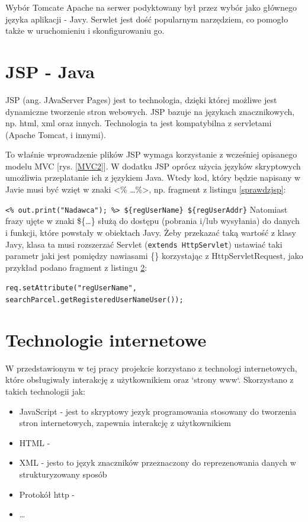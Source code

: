 \documentclass[eng,printmode,oneside]{mgr}
\begin{document}
Wybór Tomcate Apache na serwer podyktowany był przez wybór jako głównego języka
aplikacji - Javy. Serwlet jest dość popularnym narzędziem, co pomogło także w
uruchomieniu i skonfigurowaniu go.
\section{JSP - Java}

JSP (ang. JAvaServer Pages) jest to technologia, dzięki której możliwe jest
dynamiczne tworzenie stron webowych. JSP bazuje na językach znacznikowych, np.
html, xml oraz innych. Technologia ta jest kompatybilna z servletami (Apache
Tomcat, i innymi).

To właśnie wprowadzenie plików JSP wymaga korzystanie z wcześniej
opisanego modelu MVC [rys. \ref{MVC2}]. W dodatku JSP oprócz użycia języków
skryptowych umożliwia przeplatanie ich z językiem Java. Wtedy kod, który będzie
napisany w Javie musi być wzięt w znaki <\% \ldots \%>, np. fragment z listingu
\ref{sprawdzjsp}:

\texttt{<\% out.print("Nadawca"); \%> \$\{regUserName\}
\$\{regUserAddr\}}
Natomiast frazy ujęte w znaki \$\{\ldots\} służą do dostępu (pobrania
i/lub wysyłania) do danych i funkcji, które powstały w obiektach Javy. Żeby
przekazać taką wartość z klasy Javy, klasa ta musi rozszerzać Servlet
(\texttt{extends HttpServlet}) ustawiać taki parametr jaki jest pomiędzy
nawiasami \{\} korzystając z HttpServletRequest, jako przykład podano fragment z
listingu \ref{}:

\texttt{req.setAttribute("regUserName",
						searchParcel.getRegisteredUserNameUser());}

\section{Technologie internetowe}

W przedstawionym w tej pracy projekcie korzystano z technologi internetowych,
które obsługiwały interakcję z użytkownikiem oraz `strony www`. Skorzystano
z takich technologii jak:
\begin{itemize}
  \item JavaScript - jest to skryptowy jezyk programowania stosowany do
  tworzenia stron internetowych, zapewnia interakcję z użytkownikiem\cite{javascript.wiki}
  \item HTML - 
  \item XML - jesto to język znaczników przeznaczony do reprezenowania danych w
  strukturyzowany sposób \cite{xml.wiki}
  \item Protokół http - 
  \item \ldots
\end{itemize}
\end{document}
